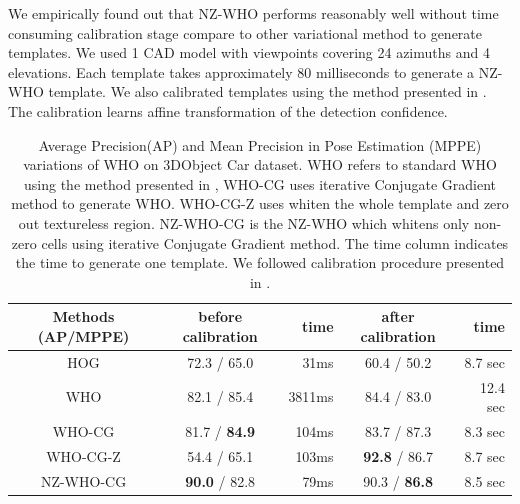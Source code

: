 \documentclass[10pt,twocolumn,letterpaper]{article}
\begin{document}
We empirically found out that NZ-WHO performs reasonably well without time consuming calibration stage compare to other variational method to generate templates. We used 1 CAD model with viewpoints covering 24 azimuths and 4 elevations. Each template takes approximately 80 milliseconds to generate a NZ-WHO template. We also calibrated templates using the method presented in \cite{Aubry14}. The calibration learns affine transformation of the detection confidence.%


\begin{table}[!htbp]
    \footnotesize
    \begin{center}
\begin{tabular}{|c|c|r|c|r|}
\hline
Methods (AP/MPPE) & before calibration  & time & after calibration \cite{Aubry14} & time \\
\hline\hline
HOG\cite{Dalal05}     & 72.3 / 65.0           &  31ms  & 60.4 / 50.2                 & 8.7 sec \\ 
WHO\cite{Hariharan12} & 82.1 / 85.4           &  3811ms& 84.4 / 83.0                 & 12.4 sec  \\
WHO-CG                & 81.7 / \textbf{84.9}  &  104ms & 83.7 / 87.3                 & 8.3 sec \\
WHO-CG-Z              & 54.4 / 65.1           &  103ms & \textbf{92.8} / 86.7        & 8.7 sec  \\
NZ-WHO-CG             & \textbf{90.0} / 82.8  &   79ms & 90.3 / \textbf{86.8}        & 8.5 sec   \\
\hline
\end{tabular}
\end{center}
\caption{Average Precision(AP) and Mean Precision in Pose Estimation (MPPE) \cite{Lopez-Sastre11} variations of WHO on 3DObject Car dataset\cite{Savarese07}. WHO refers to standard WHO using the method presented in \cite{Hariharan12}, WHO-CG uses iterative Conjugate Gradient method to generate WHO. WHO-CG-Z uses whiten the whole template and zero out textureless region. NZ-WHO-CG is the NZ-WHO which whitens only non-zero cells using iterative Conjugate Gradient method. The time column indicates the time to generate one template. We followed calibration procedure presented in \cite{Aubry14}.}
\label{tab:who_initializations}
\end{table}
\end{document}
